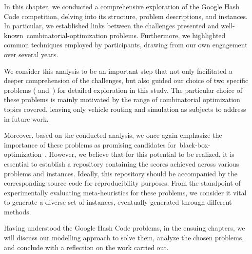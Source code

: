 In this chapter, we conducted a comprehensive exploration of the Google Hash
Code competition, delving into its structure, problem descriptions, and
instances. In particular, we established links between the challenges presented
and well-known~\acrshort{combinatorial-optimization} problems. Furthermore, we
highlighted common techniques employed by participants, drawing from our own
engagement over several years.

We consider this analysis to be an important step that not only facilitated a
deeper comprehension of the challenges, but also guided our choice of two
specific problems (
and~) for detailed exploration in
this study. The particular choice of these problems is mainly motivated by the
range of combinatorial optimization topics covered, leaving only vehicle routing
and simulation as subjects to address in future work.

Moreover, based on the conducted analysis, we once again emphasize the
importance of these problems as promising candidates
for~\acrshort{black-box-optimization}~\cite{bartz-beielstein2020benchmarking}.
However, we believe that for this potential to be realized, it is essential to
establish a repository containing the scores achieved across various problems
and instances. Ideally, this repository should be accompanied by the
corresponding source code for reproducibility purposes. From the standpoint of
experimentally evaluating meta-heuristics for these problems, we consider it
vital to generate a diverse set of instances, eventually generated through
different methods.

Having understood the Google Hash Code problems, in the ensuing chapters, we
will discuss our modelling approach to solve them, analyze the chosen problems,
and conclude with a reflection on the work carried out.